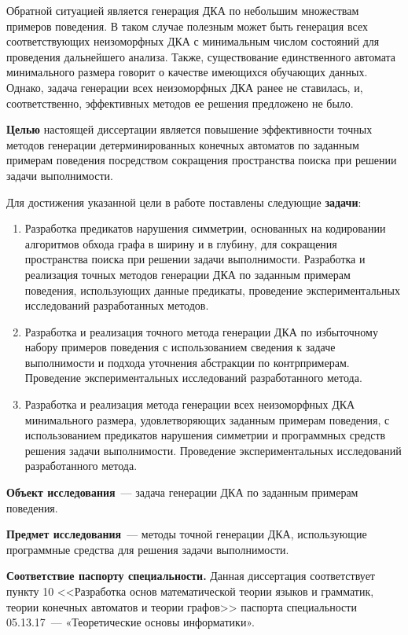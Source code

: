 Обратной ситуацией является генерация ДКА по небольшим множествам примеров поведения.
В таком случае полезным может быть генерация всех соответствующих неизоморфных ДКА с минимальным числом состояний для проведения дальнейшего анализа.
Также, существование единственного автомата минимального размера говорит о качестве имеющихся обучающих данных.
Однако, задача генерации всех неизоморфных ДКА ранее не ставилась, и, соответственно, эффективных методов ее решения предложено не было.

\textbf{Целью} настоящей диссертации является повышение эффективности точных методов генерации детерминированных конечных автоматов по заданным примерам поведения посредством сокращения пространства поиска при решении задачи выполнимости.

Для достижения указанной цели в работе поставлены следующие \textbf{задачи}:
\begin{enumerate}
  \item Разработка предикатов нарушения симметрии, основанных на кодировании алгоритмов обхода графа в ширину и в глубину, для сокращения пространства поиска при решении задачи выполнимости.
  Разработка и реализация точных методов генерации ДКА по заданным примерам поведения, использующих данные предикаты, проведение экспериментальных исследований разработанных методов.

  \item Разработка и реализация точного метода генерации ДКА по избыточному набору примеров поведения с использованием сведения к задаче выполнимости и подхода уточнения абстракции по контрпримерам.
  Проведение экспериментальных исследований разработанного метода.
  
  \item Разработка и реализация метода генерации всех неизоморфных ДКА минимального размера, удовлетворяющих заданным примерам поведения, с использованием предикатов нарушения симметрии и программных средств решения задачи выполнимости.
  Проведение экспериментальных исследований разработанного метода.
\end{enumerate}

\textbf{Объект исследования}~{---} задача генерации ДКА по заданным примерам поведения.

\textbf{Предмет исследования}~{---} методы точной генерации ДКА, использующие программные средства для решения задачи выполнимости.

\textbf{Соответствие паспорту специальности.} Данная диссертация соответствует пункту 10 <<Разработка основ математической теории языков и грамматик, теории конечных автоматов и теории графов>> паспорта специальности 05.13.17~--- «Теоретические основы информатики».

